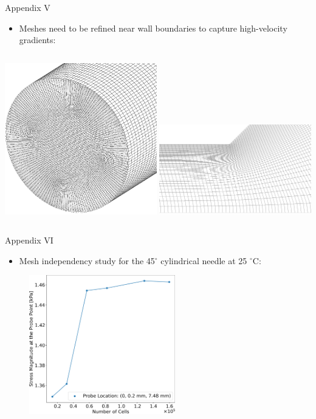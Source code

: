 \begin{frame}{Appendix V}
\begin{itemize}
    \item Meshes need to be refined near wall boundaries to capture high-velocity gradients:
\end{itemize}
\vspace{2mm}
\begin{columns}
\centering
\includegraphics[trim = 0mm 0mm 0mm 0mm, clip, width=2.6in]{./images/mesh_validation.png}
\centering
\includegraphics[trim = 0mm 0mm 0mm 0mm, clip, width=2.6in]{./images/mesh_simulation.png}
\end{columns}
\end{frame}


\begin{frame}{Appendix VI}
\begin{itemize}
    \item Mesh independency study for the 45$^{\circ}$ cylindrical needle at 25 $^{\circ}$C:
\end{itemize}
\begin{figure}
    \centering
    \includegraphics[trim = 0mm 0mm 0mm 0mm, clip, width=2.5in]{./images/MDT_45_25C.png}
\end{figure}
\end{frame}




